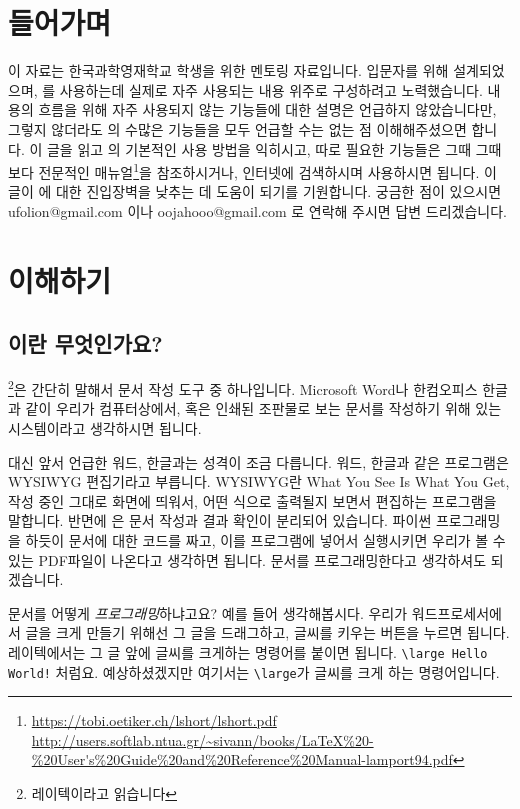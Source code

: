 
\section*{들어가며}
이 자료는 한국과학영재학교 학생을 위한 \lt{} 멘토링 자료입니다.
입문자를 위해 설계되었으며, \lt 를 사용하는데 실제로 자주 사용되는 내용 위주로 구성하려고 노력했습니다.
내용의 흐름을 위해 자주 사용되지 않는 기능들에 대한 설명은 언급하지 않았습니다만, 그렇지 않더라도 \lt 의 수많은 기능들을 모두 언급할 수는 없는 점 이해해주셨으면 합니다.
이 글을 읽고 \lt 의 기본적인 사용 방법을 익히시고, 따로 필요한 기능들은 그때 그때 보다 전문적인 매뉴얼\footnote{\url{https://tobi.oetiker.ch/lshort/lshort.pdf}\\ \url{http://users.softlab.ntua.gr/~sivann/books/LaTeX\%20-\%20User's\%20Guide\%20and\%20Reference\%20Manual-lamport94.pdf}}을 참조하시거나, 인터넷에 검색하시며 사용하시면 됩니다.
이 글이 \lt 에 대한 진입장벽을 낮추는 데 도움이 되기를 기원합니다.
궁금한 점이 있으시면 ufolion@gmail.com 이나 oojahooo@gmail.com 로 연락해 주시면 답변 드리겠습니다.
\section{\lt 이해하기}
\label{sec:1}

\subsection{\lt 이란 무엇인가요?}
\label{sec:1.1}
\lt \footnote{레이텍이라고 읽습니다}은 간단히 말해서 문서 작성 도구 중 하나입니다.
Microsoft Word나 한컴오피스 한글과 같이 우리가 컴퓨터상에서, 혹은 인쇄된 조판물로 보는 문서를 작성하기 위해 있는 시스템이라고 생각하시면 됩니다.

대신 앞서 언급한 워드, 한글과는 성격이 조금 다릅니다.
워드, 한글과 같은 프로그램은 WYSIWYG 편집기라고 부릅니다.
WYSIWYG란 What You See Is What You Get, 작성 중인 그대로 화면에 띄워서, 어떤 식으로 출력될지 보면서 편집하는 프로그램을 말합니다.
반면에 \lt 은 문서 작성과 결과 확인이 분리되어 있습니다.
파이썬 프로그래밍을 하듯이 문서에 대한 코드를 짜고, 이를 \lt 프로그램에 넣어서 실행시키면 우리가 볼 수 있는 PDF파일이 나온다고 생각하면 됩니다.
문서를 프로그래밍한다고 생각하셔도 되겠습니다.

문서를 어떻게 \emph{프로그래밍}하냐고요?
예를 들어 생각해봅시다.
우리가 워드프로세서에서 글을 크게 만들기 위해선 그 글을 드래그하고, 글씨를 키우는 버튼을 누르면 됩니다.
레이텍에서는 그 글 앞에 글씨를 크게하는 명령어를 붙이면 됩니다. \verb|\large Hello World!| 처럼요.
예상하셨겠지만 여기서는 \verb|\large|가 글씨를 크게 하는 명령어입니다.


